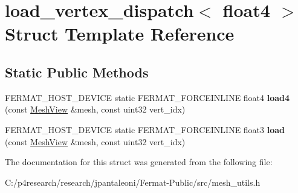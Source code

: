 \hypertarget{structload__vertex__dispatch_3_01float4_01_4}{}\section{load\+\_\+vertex\+\_\+dispatch$<$ float4 $>$ Struct Template Reference}
\label{structload__vertex__dispatch_3_01float4_01_4}
\subsection*{Static Public Methods}
\begin{DoxyCompactItemize}
\item 
\mbox{\label{structload__vertex__dispatch_3_01float4_01_4_afaf622b04bcf31116368a089d3c4b89a}} 
F\+E\+R\+M\+A\+T\+\_\+\+H\+O\+S\+T\+\_\+\+D\+E\+V\+I\+CE static F\+E\+R\+M\+A\+T\+\_\+\+F\+O\+R\+C\+E\+I\+N\+L\+I\+NE float4 {\bfseries load4} (const \hyperlink{struct_mesh_view}{Mesh\+View} \&mesh, const uint32 vert\+\_\+idx)
\item 
\mbox{\label{structload__vertex__dispatch_3_01float4_01_4_a8db96a600f34c8f8e50dd546ea5cef46}} 
F\+E\+R\+M\+A\+T\+\_\+\+H\+O\+S\+T\+\_\+\+D\+E\+V\+I\+CE static F\+E\+R\+M\+A\+T\+\_\+\+F\+O\+R\+C\+E\+I\+N\+L\+I\+NE float3 {\bfseries load} (const \hyperlink{struct_mesh_view}{Mesh\+View} \&mesh, const uint32 vert\+\_\+idx)
\end{DoxyCompactItemize}


The documentation for this struct was generated from the following file\+:\begin{DoxyCompactItemize}
\item 
C\+:/p4research/research/jpantaleoni/\+Fermat-\/\+Public/src/mesh\+\_\+utils.\+h\end{DoxyCompactItemize}
